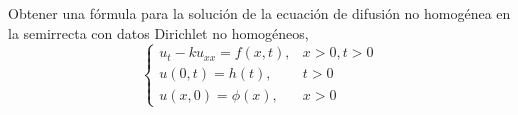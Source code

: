 \begin{problem}[21] Obtener una fórmula para la solución de la ecuación de difusión no homogénea en la semirrecta con datos Dirichlet no homogéneos,
\[ \begin{cases}
u_t-ku_{xx}=f(x,t),      & x>0, t>0 \\
u(0,t)=h(t),             & t>0 \\
u(x,0)=\phi(x),          & x>0
\end{cases} \] 

\solution

\end{problem}